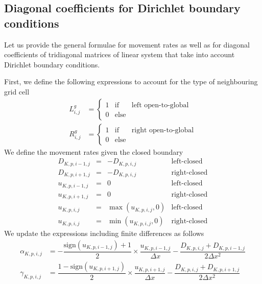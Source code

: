 \subsection{Diagonal coefficients for Dirichlet boundary conditions}

\noindent Let us provide the general formulae for movement rates as well as for diagonal coefficients of tridiagonal matrices of linear system that take into account Dirichlet boundary conditions.

First, we define the following expressions to account for the type of neighbouring grid cell
\begin{align}
  \label{eq:global-flag}
  L^g_{i,j} &= \left\lbrace
    \begin{array}{lll}
      1 &\mbox{if} & \mbox{left open-to-global}\\
      0 & \mbox{else}
    \end{array}
  \right.\\
  R^g_{i,j} &= \left\lbrace
    \begin{array}{lll}
      1 &\mbox{if} & \mbox{right open-to-global}\\
      0 & \mbox{else}
    \end{array}
  \right.
\end{align}
We define the movement rates given the closed boundary
\begin{equation}
  \begin{array}{lcll}
    D_{K,p,i-1,j} &=& -D_{K,p,i,j} 
    & \mbox{left-closed}\\
    D_{K,p,i+1,j} &=& -D_{K,p,i,j} 
    & \mbox{right-closed}\\
    u_{K,p,i-1,j} &=& 0
    & \mbox{left-closed}\\
    u_{K,p,i+1,j} &=& 0
    & \mbox{right-closed}\\
    u_{K,p,i,j} &=&
    \max(u_{K,p,i,j},0)
    & \mbox{left-closed}\\
    u_{K,p,i,j} &=&
    \min(u_{K,p,i,j},0)
    & \mbox{right-closed}
  \end{array}
\end{equation}
We update the expressions including finite differences as follows
\begin{eqnarray}
  \label{eq:alpha}
  \alpha_{K,p,i,j} &= -\dfrac{\mbox{sign}(u_{K,p,i-1,j})+1}{2}
  \times\dfrac{u_{K,p,i-1,j}}{\Delta x}
   -\dfrac{D_{K,p,i,j}+D_{K,p,i-1,j}}{2\Delta x^2}\\
   \gamma_{K,p,i,j} & = \dfrac{1-\mbox{sign}(u_{K,p,i+1,j})}{2}
   \times\dfrac{u_{K,p,i+1,j}}{\Delta x}
   -\dfrac{D_{K,p,i,j}+D_{K,p,i+1,j}}{2\Delta x^2}
\end{eqnarray}
